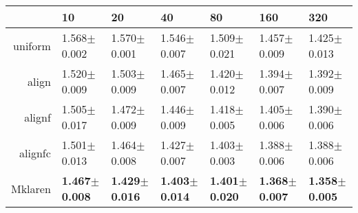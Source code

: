 \begin{table}[ht]
\centering
\begin{tabular}{rllllll}
  \hline
 & 10 & 20 & 40 & 80 & 160 & 320 \\ 
  \hline
uniform & 1.568$\pm$0.002 & 1.570$\pm$0.001 & 1.546$\pm$0.007 & 1.509$\pm$0.021 & 1.457$\pm$0.009 & 1.425$\pm$0.013 \\ 
  align & 1.520$\pm$0.009 & 1.503$\pm$0.009 & 1.465$\pm$0.007 & 1.420$\pm$0.012 & 1.394$\pm$0.007 & 1.392$\pm$0.009 \\ 
  alignf & 1.505$\pm$0.017 & 1.472$\pm$0.009 & 1.446$\pm$0.009 & 1.418$\pm$0.005 & 1.405$\pm$0.006 & 1.390$\pm$0.006 \\ 
  alignfc & 1.501$\pm$0.013 & 1.464$\pm$0.008 & 1.427$\pm$0.007 & 1.403$\pm$0.003 & 1.388$\pm$0.006 & 1.388$\pm$0.006 \\ 
  Mklaren & \textbf{1.467$\pm$0.008} & \textbf{1.429$\pm$0.016} & \textbf{1.403$\pm$0.014} & \textbf{1.401$\pm$0.020} & \textbf{1.368$\pm$0.007} & \textbf{1.358$\pm$0.005} \\ 
   \hline
\end{tabular}
\end{table}
